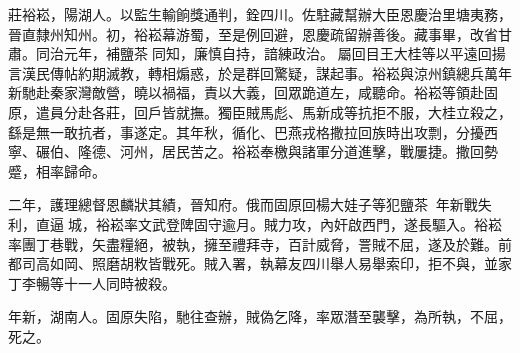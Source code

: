 \begin{pinyinscope}
莊裕崧，陽湖人。以監生輸餉獎通判，銓四川。佐駐藏幫辦大臣恩慶治里塘夷務，晉直隸州知州。初，裕崧幕游蜀，至是例回避，恩慶疏留辦善後。藏事畢，改省甘肅。同治元年，補鹽茶同知，廉慎自持，諳練政治。屬回目王大桂等以平遠回揚言漢民傳帖約期滅教，轉相煽惑，於是群回驚疑，謀起事。裕崧與涼州鎮總兵萬年新馳赴秦家灣敵營，曉以禍福，責以大義，回眾跪道左，咸聽命。裕崧等領赴固原，遣員分赴各莊，回戶皆就撫。獨臣賊馬彪、馬新成等抗拒不服，大桂立殺之，繇是無一敢抗者，事遂定。其年秋，循化、巴燕戎格撒拉回族時出攻剽，分擾西寧、碾伯、隆德、河州，居民苦之。裕崧奉檄與諸軍分道進擊，戰屢捷。撒回勢蹙，相率歸命。

二年，護理總督恩麟狀其績，晉知府。俄而固原回楊大娃子等犯鹽茶，年新戰失利，直逼城，裕崧率文武登陴固守逾月。賊力攻，內奸啟西門，遂長驅入。裕崧率團丁巷戰，矢盡糧絕，被執，擁至禮拜寺，百計威脅，詈賊不屈，遂及於難。前都司高如岡、照磨胡敉皆戰死。賊入署，執幕友四川舉人易舉索印，拒不與，並家丁李暢等十一人同時被殺。

年新，湖南人。固原失陷，馳往查辦，賊偽乞降，率眾潛至襲擊，為所執，不屈，死之。


\end{pinyinscope}